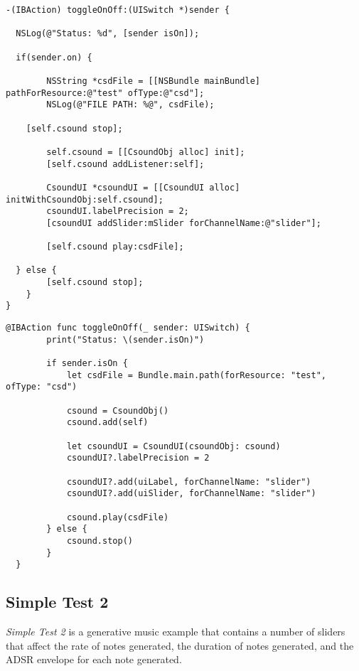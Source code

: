 \documentclass[11pt]{article}
\begin{document}
\begin{lstlisting}[caption=Example code showing configuring and starting a CsoundObj in Objective-C]
-(IBAction) toggleOnOff:(UISwitch *)sender {

  NSLog(@"Status: %d", [sender isOn]);

  if(sender.on) {

        NSString *csdFile = [[NSBundle mainBundle] pathForResource:@"test" ofType:@"csd"];
        NSLog(@"FILE PATH: %@", csdFile);

    [self.csound stop];

        self.csound = [[CsoundObj alloc] init];
        [self.csound addListener:self];

        CsoundUI *csoundUI = [[CsoundUI alloc] initWithCsoundObj:self.csound];
        csoundUI.labelPrecision = 2;
        [csoundUI addSlider:mSlider forChannelName:@"slider"];

        [self.csound play:csdFile];

  } else {
        [self.csound stop];
    }
}

\end{lstlisting}

\pagebreak
\begin{lstlisting}[caption=Example code showing configuring and starting a CsoundObj in Swift 3]
  @IBAction func toggleOnOff(_ sender: UISwitch) {
        print("Status: \(sender.isOn)")
        
        if sender.isOn {
            let csdFile = Bundle.main.path(forResource: "test", ofType: "csd")
            
            csound = CsoundObj()
            csound.add(self)
            
            let csoundUI = CsoundUI(csoundObj: csound)
            csoundUI?.labelPrecision = 2
            
            csoundUI?.add(uiLabel, forChannelName: "slider")
            csoundUI?.add(uiSlider, forChannelName: "slider")
            
            csound.play(csdFile)
        } else {
            csound.stop()
        }
  }
\end{lstlisting}

\subsection{Simple Test 2}

\emph{Simple Test 2} is a generative music example that contains a number of sliders that affect the rate of notes generated, the duration of notes generated, and the ADSR envelope for each note generated.
\end{document}
